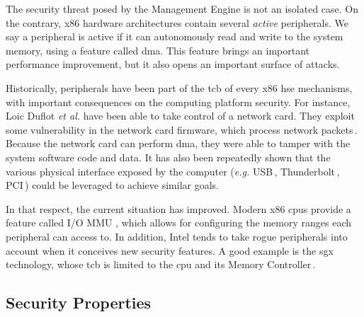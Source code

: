 The security threat posed by the Management Engine is not an isolated case.
%
On the contrary, x86 hardware architectures contain several \emph{active}
peripherals.
%
We say a peripheral is active if it can autonomously read and write to the
system memory, using a feature called \ac{dma}. 
%
This feature brings an important performance improvement, but it also opens an
important surface of attacks.

Historically, peripherals have been part of the \ac{tcb} of every x86 \ac{hse}
mechanisms, with important consequences on the computing platform security. 
%
For instance, Loic Duflot \emph{et al.} have been able to take control of a
network card. They exploit some vulnerability in the network card firmware, which process network
packets\,\cite{duflot2010network}.
%
Because the network card can perform \ac{dma}, they were able to tamper with the
system software code and data.
%
It has also been repeatedly shown that the various physical interface exposed by
the computer (\emph{e.g.} USB\,\cite{nohl2014badusb},
Thunderbolt\,\cite{hudson2015thunderstrike}, PCI\,\cite{chifflier2013uefi})
could be leveraged to achieve similar goals.

In that respect, the current situation has improved.
%
Modern x86 \acp{cpu} provide a feature called I/O MMU , which allows for
configuring the memory ranges each peripheral can access to.
%
In addition, Intel tends to take rogue peripherals into account when it
conceives new security features. 
%
A good example is the \ac{sgx} technology, whose \ac{tcb} is limited to the
\ac{cpu} and its Memory Controller\,\cite{costan2016sgxexplained}.

\subsection{Security Properties}

